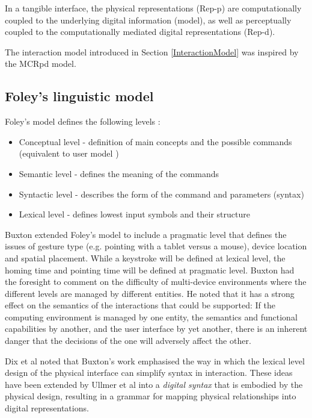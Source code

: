 In a tangible interface, the physical representations (Rep-p) are computationally coupled to the underlying digital information (model), as well as perceptually coupled to the computationally mediated digital representations (Rep-d). 

The interaction model introduced in Section \ref{InteractionModel} was inspired by the \ac{MCRpd} model.

	
	
\subsection{Foley's linguistic model}

	Foley's model defines the following levels \cite{DeRuiter1988}:
	
	\begin{itemize}
		\item Conceptual level - definition of main concepts and the possible commands (equivalent to user model \cite{Buxton1983})
		\item Semantic level - defines the meaning of the commands
		\item Syntactic level - describes the form of the command and parameters (syntax)
		\item Lexical level - defines lowest input symbols and their structure
	\end{itemize}
	
	Buxton \cite{Buxton1983} extended Foley's model to include a pragmatic level that defines the issues of gesture type (e.g. pointing with a tablet versus a mouse), device location and spatial placement. While a keystroke will be defined at lexical level, the homing time and pointing time will be defined at pragmatic level. Buxton had the foresight to comment on the difficulty of multi-device environments where the different levels are managed by different entities. He noted that it has a strong effect on the semantics of the interactions that could be supported: If the computing environment is managed by one entity, the semantics and functional capabilities by another, and the user interface by yet another, there is an inherent danger that the decisions of the one will adversely affect the other. 
	
	Dix et al \cite{Dix2008} noted that Buxton's work emphasised the way in which the lexical level design of the physical interface can simplify syntax in interaction. These ideas have been extended by Ullmer et al \cite{Ullmer2005} into a \emph{digital syntax} that is embodied by the physical design, resulting in a grammar for mapping physical relationships into digital representations.
	
